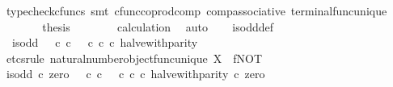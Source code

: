 \begin{isabellebody}
\ {\isacharparenleft}{\kern0pt}typecheck{\isacharunderscore}{\kern0pt}cfuncs{\isacharcomma}{\kern0pt}\ smt\ cfunc{\isacharunderscore}{\kern0pt}coprod{\isacharunderscore}{\kern0pt}comp\ comp{\isacharunderscore}{\kern0pt}associative{}\ terminal{\isacharunderscore}{\kern0pt}func{\isacharunderscore}{\kern0pt}unique{\isacharparenright}{\kern0pt}\isanewline
\ \ \ \ \isamarkupfalse%
\ \isamarkupfalse%
\ {\isacharquery}{\kern0pt}thesis\isanewline
\ \ \ \ \ \ \isamarkupfalse%
\ calculation\ \isamarkupfalse%
\ auto\isanewline
\ \ \isamarkupfalse%
\isanewline
{}\isamarkupfalse%
%
\endisatagproof
{\isafoldproof}%
%
\isadelimproof
\isanewline
%
\endisadelimproof
\isanewline
{}\isamarkupfalse%
\ is{\isacharunderscore}{\kern0pt}odd{\isacharunderscore}{\kern0pt}def{}{\isacharcolon}{\kern0pt}\isanewline
\ \ {\isachardoublequoteopen}is{\isacharunderscore}{\kern0pt}odd\ {\isacharequal}{\kern0pt}\ {\isacharparenleft}{\kern0pt}{\isacharparenleft}{\kern0pt}{\isasymf}\ {\isasymcirc}\isactrlsub c\ {\isasymbeta}\isactrlbsub {\isasymnat}\isactrlsub c\isactrlesub {\isacharparenright}{\kern0pt}\ {\isasymamalg}\ {\isacharparenleft}{\kern0pt}{\isasymt}\ {\isasymcirc}\isactrlsub c\ {\isasymbeta}\isactrlbsub {\isasymnat}\isactrlsub c\isactrlesub {\isacharparenright}{\kern0pt}{\isacharparenright}{\kern0pt}\ {\isasymcirc}\isactrlsub c\ halve{\isacharunderscore}{\kern0pt}with{\isacharunderscore}{\kern0pt}parity{\isachardoublequoteclose}\isanewline
%
\isadelimproof
%
\endisadelimproof
%
\isatagproof
{}\isamarkupfalse%
\ {\isacharparenleft}{\kern0pt}etcs{\isacharunderscore}{\kern0pt}rule\ natural{\isacharunderscore}{\kern0pt}number{\isacharunderscore}{\kern0pt}object{\isacharunderscore}{\kern0pt}func{\isacharunderscore}{\kern0pt}unique{\isacharbrackleft}{\kern0pt}\ X{\isacharequal}{\kern0pt}{\isasymOmega}{\isacharcomma}{\kern0pt}\ \ f{\isacharequal}{\kern0pt}NOT{\isacharbrackright}{\kern0pt}{\isacharparenright}{\kern0pt}\isanewline
\ \ \isamarkupfalse%
\ {\isachardoublequoteopen}is{\isacharunderscore}{\kern0pt}odd\ {\isasymcirc}\isactrlsub c\ zero\ {\isacharequal}{\kern0pt}\ {\isacharparenleft}{\kern0pt}{\isacharparenleft}{\kern0pt}{\isasymf}\ {\isasymcirc}\isactrlsub c\ {\isasymbeta}\isactrlbsub {\isasymnat}\isactrlsub c\isactrlesub {\isacharparenright}{\kern0pt}\ {\isasymamalg}\ {\isacharparenleft}{\kern0pt}{\isasymt}\ {\isasymcirc}\isactrlsub c\ {\isasymbeta}\isactrlbsub {\isasymnat}\isactrlsub c\isactrlesub {\isacharparenright}{\kern0pt}\ {\isasymcirc}\isactrlsub c\ halve{\isacharunderscore}{\kern0pt}with{\isacharunderscore}{\kern0pt}parity{\isacharparenright}{\kern0pt}\ {\isasymcirc}\isactrlsub c\ zero{\isachardoublequoteclose}\isanewline

\end{isabellebody}
